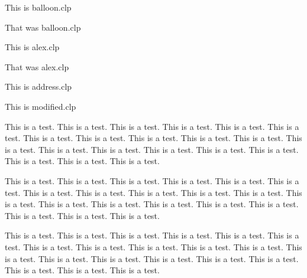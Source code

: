 


\nopagenumbers

\def\newpage{\vfill\eject}

\noindent This is balloon.clp

\vskip 3.7in

%

\noindent That was balloon.clp

\noindent This is alex.clp

\vskip 2.4in

%

\noindent That was alex.clp

\newpage

\noindent This is address.clp

\vskip 3in

%

\noindent This is modified.clp

\vskip 2in

%

\newpage

\noindent 
This is a test. This is a test. This is a test. This is a test.
This is a test. This is a test. This is a test. This is a test.
This is a test. This is a test. This is a test. This is a test.
This is a test. This is a test. This is a test. This is a test.
This is a test. This is a test. This is a test. This is a test.

\vskip 1.5in

%

\noindent 
This is a test. This is a test. This is a test. This is a test.
This is a test. This is a test. This is a test. This is a test.
This is a test. This is a test. This is a test. This is a test.
This is a test. This is a test. This is a test. This is a test.
This is a test. This is a test. This is a test. This is a test.

\vskip 3.2in

%

\noindent 
This is a test. This is a test. This is a test. This is a test.
This is a test. This is a test. This is a test. This is a test.
This is a test. This is a test. This is a test. This is a test.
This is a test. This is a test. This is a test. This is a test.
This is a test. This is a test. This is a test. This is a test.

